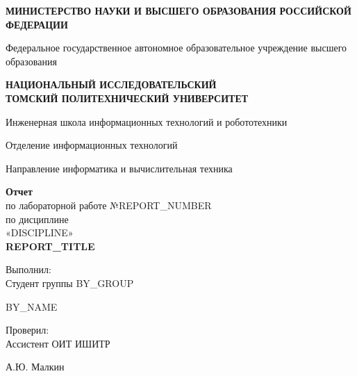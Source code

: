 \documentclass[a4paper,12pt]{article}
\title{}
\author{}
\date{}
\begin{document}
\begin{center}
    \textbf{МИНИСТЕРСТВО НАУКИ И ВЫСШЕГО ОБРАЗОВАНИЯ РОССИЙСКОЙ ФЕДЕРАЦИИ}

    \vspace{0.1cm}

    Федеральное государственное автономное образовательное учреждение высшего образования

    \vspace{0.1cm}

    \textbf{НАЦИОНАЛЬНЫЙ ИССЛЕДОВАТЕЛЬСКИЙ \\ТОМСКИЙ ПОЛИТЕХНИЧЕСКИЙ УНИВЕРСИТЕТ}

    \vspace{1.0cm}

    Инженерная школа информационных технологий и робототехники

    Отделение информационных технологий

    Направление информатика и вычислительная техника

    \vspace{2cm}

    \textbf{Отчет} \\
    по лабораторной работе №REPORT_NUMBER \\
    \vspace{0.5cm}
    по дисциплине \\
    «\MakeUppercase{DISCIPLINE}» \\
    \vspace{0.5cm}
    \textbf{REPORT_TITLE}
\end{center}

\vspace{1.5cm}

\begin{flushleft}
    Выполнил: \\
    Студент группы BY_GROUP
\end{flushleft}
\begin{center}
    \underline{\hspace{5cm}}
\end{center}
\begin{flushright}
    BY_NAME
\end{flushright}

\vspace{0.5cm}

\begin{flushleft}
    Проверил: \\
    Ассистент ОИТ ИШИТР
\end{flushleft}
\begin{center}
    \underline{\hspace{5cm}}
\end{center}
\begin{flushright}
    А.Ю. Малкин
\end{flushright}
\end{document}

